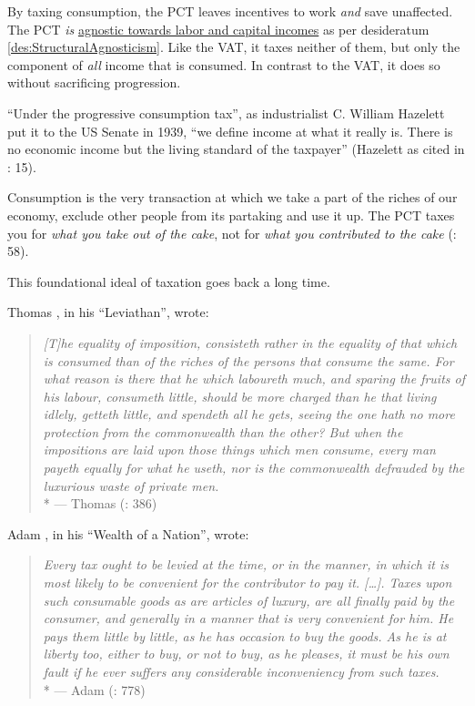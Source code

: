 By taxing consumption, the PCT leaves incentives to work \emph{and} save unaffected. The PCT \emph{is} \hyperref[des:StructuralAgnosticism]{agnostic towards labor and capital incomes} as per desideratum \ref{des:StructuralAgnosticism}. Like the VAT, it taxes neither of them, but only the component of \emph{all} income that is consumed. In contrast to the VAT, it does so without sacrificing progression.

``Under the progressive consumption tax'', as industrialist C. William Hazelett put it to the US Senate in 1939, ``we define income at what it really is. There is no economic income but the living standard of the taxpayer'' (Hazelett as cited in \citealt{Bank2004}: 15).
 
Consumption is the very transaction at which we take a part of the riches of our economy, exclude other people from its partaking and use it up. The PCT taxes you for \emph{what you take out of the cake}, not for \emph{what you contributed to the cake} (\citealt{Seidman1997}: 58).  

This foundational ideal of taxation goes back a long time.

Thomas \citeauthor{Hobbes-1651-aa}, in his ``Leviathan'', wrote:

\begin{quote}
	\emph{[T]he equality of imposition, consisteth rather in the equality of that which is consumed than of the riches of the persons that consume the same. For what reason is there that he which laboureth much, and sparing the fruits of his labour, consumeth little, should be more charged than he that living idlely, getteth little, and spendeth all he gets, seeing the one hath no more protection from the commonwealth than the other? But when the impositions are laid upon those things which men consume, every man payeth equally for what he useth, nor is the commonwealth defrauded by the luxurious waste of private men.}\\*
	--- Thomas \citeauthor{Hobbes-1651-aa} (\citeyear{Hobbes-1651-aa}: 386)
\end{quote}

Adam \citeauthor{Smith-1776-lq}, in his ``Wealth of a Nation'', wrote:

\begin{quote}
	\emph{Every tax ought to be levied at the time, or in the manner, in which it is most likely to be convenient for the contributor to pay it. [\ldots]. Taxes upon such consumable goods as are articles of luxury, are all finally paid by the consumer, and generally in a manner that is very convenient for him. He pays them little by little, as he has occasion to buy the goods. As he is at liberty too, either to buy, or not to buy, as he pleases, it must be his own fault if he ever suffers any considerable inconveniency from such taxes.}\\*
	--- Adam \citeauthor{Smith-1776-lq} (\citeyear{Smith-1776-lq}: 778)
\end{quote}

